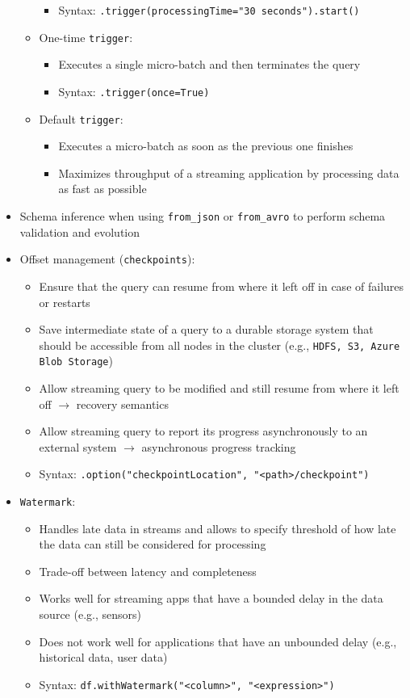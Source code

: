 \documentclass[11pt]{scrartcl}
\begin{document}
\begin{itemize}
\begin{itemize}
\begin{itemize}
			\item Syntax: \texttt{.trigger(processingTime="30 seconds").start()}
		\end{itemize}
		\item One-time \texttt{trigger}:
		\begin{itemize}
			\item Executes a single micro-batch and then terminates the query
			\item Syntax: \texttt{.trigger(once=True)}
		\end{itemize}
		\item Default \texttt{trigger}: 
		\begin{itemize}
			\item Executes a micro-batch as soon as the previous one finishes
			\item Maximizes throughput of a streaming application by processing data as fast as possible
		\end{itemize}	
	\end{itemize}
	\item Schema inference when using \texttt{from\_json} or \texttt{from\_avro} to perform schema validation and evolution
	\item Offset management (\texttt{checkpoints}): 
	\begin{itemize}
		\item Ensure that the query can resume from where it left off in case of failures or restarts
		\item Save intermediate state of a query to a durable storage system that should be accessible from all nodes in the cluster (e.g., \texttt{HDFS, S3, Azure Blob Storage})
		\item Allow streaming query to be modified and still resume from where it left off $\to$ recovery semantics
		\item Allow streaming query to report its progress asynchronously to an external system $\to$ asynchronous progress tracking
		\item Syntax: \texttt{.option("checkpointLocation", "<path>/checkpoint")}
	\end{itemize}
	\item \texttt{Watermark}: 
	\begin{itemize}
		\item Handles late data in streams and allows to specify threshold of how late the data can still be considered for processing
		\item Trade-off between latency and completeness
		\item Works well for streaming apps that have a bounded delay in the data source (e.g., sensors)
		\item Does not work well for applications that have an unbounded delay (e.g., historical data, user data)
		\item Syntax: \texttt{df.withWatermark("<column>", "<expression>")}
	\end{itemize}
\end{itemize}
\end{document}
